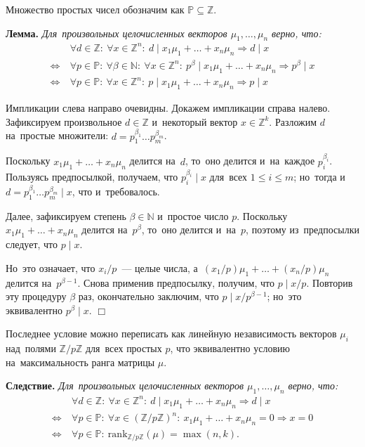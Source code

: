 \documentclass[twoside]{article}
\begin{document}
Множество простых чисел обозначим как $\mathbb{P} \subseteq \mathbb{Z}$.

\medskip\noindent\textbf{Лемма.}\emph{
    Для~произвольных целочисленных векторов $\mu_1, \ldots, \mu_n$ верно, что:
    \begin{align*}
                         & \forall d \in \mathbb{Z}{:}\ \forall x \in \mathbb{Z}^n{:}\ d \mid x_1 \mu_1 + \ldots + x_n \mu_n \Rightarrow d \mid x \\
        \Leftrightarrow\ & \forall p \in \mathbb{P}{:}\ \forall \beta \in \mathbb{N}{:}\ \forall x \in \mathbb{Z}^n{:}\ p^\beta \mid x_1 \mu_1 + \ldots + x_n \mu_n \Rightarrow p^\beta \mid x \\
        \Leftrightarrow\ & \forall p \in \mathbb{P}{:}\ \forall x \in \mathbb{Z}^n{:}\ p \mid x_1 \mu_1 + \ldots + x_n \mu_n \Rightarrow p \mid x
    \end{align*}
}

    Импликации слева направо очевидны. Докажем импликации справа налево.
    Зафиксируем произвольное $d \in \mathbb{Z}$ и~некоторый вектор $x \in \mathbb{Z}^k$.
    Разложим $d$ на~простые множители: $d = p_1^{\beta_1} \ldots p_m^{\beta_m}$.

    Поскольку $x_1 \mu_1 + \ldots + x_n \mu_n$ делится на~$d$, то~оно делится и~на~каждое $p_i^{\beta_i}$.
    Пользуясь предпосылкой, получаем, что $p_i^{\beta_i} \mid x$ для~всех $1 \leq i \leq m$;
    но~тогда и~$d = p_1^{\beta_1} \ldots p_m^{\beta_m} \mid x$, что и~требовалось.

    Далее, зафиксируем степень $\beta \in \mathbb{N}$ и~простое число $p$.
    Поскольку $x_1 \mu_1 + \ldots + x_n \mu_n$ делится на~$p^\beta$,
    то~оно делится и~на~$p$, поэтому из~предпосылки следует, что $p \mid x$.

    Но~это означает, что $x_i / p$~— целые числа, а~$(x_1 / p) \mu_1 + \ldots + (x_n / p) \mu_n$ делится на~$p^{\beta - 1}$.
    Снова применив предпосылку, получим, что $p \mid x / p$.
    Повторив эту процедуру $\beta$ раз, окончательно заключим, что $p \mid x / p^{\beta - 1}$;
    но~это эквивалентно $p^\beta \mid x$.
\hfill$\Box$\medskip

Последнее условие можно переписать как линейную независимость векторов $\mu_i$ над~полями $\mathbb{Z} / p\mathbb{Z}$ для~всех простых $p$,
что эквивалентно условию на~максимальность ранга матрицы $\mu$.

\medskip\noindent\textbf{Следствие.}\emph{
    Для~произвольных целочисленных векторов $\mu_1, \ldots, \mu_n$ верно, что:
    \begin{align*}
                         & \forall d \in \mathbb{Z}{:}\ \forall x \in \mathbb{Z}^n{:}\ d \mid x_1 \mu_1 + \ldots + x_n \mu_n \Rightarrow d \mid x \\
        \Leftrightarrow\ & \forall p \in \mathbb{P}{:}\ \forall x \in (\mathbb{Z} / p\mathbb{Z})^n{:}\ x_1 \mu_1 + \ldots + x_n \mu_n = 0 \Rightarrow x = 0 \\
        \Leftrightarrow\ & \forall p \in \mathbb{P}{:}\ \mathrm{rank}_{\mathbb{Z} / p \mathbb{Z}}(\mu) = \max(n, k).
    \end{align*}
}
\end{document}
